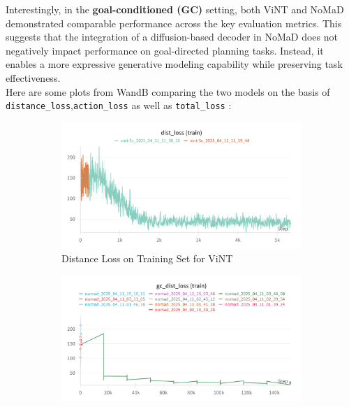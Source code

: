\documentclass[12pt]{article}
\begin{document}
Interestingly, in the \textbf{goal-conditioned (GC)} setting, both ViNT and NoMaD demonstrated comparable performance across the key evaluation metrics. This suggests that the integration of a diffusion-based decoder in NoMaD does not negatively impact performance on goal-directed planning tasks. Instead, it enables a more expressive generative modeling capability while preserving task effectiveness.\\

Here are some plots from WandB comparing the two models on the basis of \texttt{distance\_loss},\texttt{action\_loss} as well as \texttt{total\_loss} :\\
\bigskip
\begin{figure}[H]
    \centering
    \begin{subfigure}[b]{0.48\textwidth}
        \centering
        \includegraphics[width=\textwidth]{images/vint_dist_loss.png}
        \caption{Distance Loss on Training Set for ViNT}
        \label{fig:vint_action_loss_train}
    \end{subfigure}
    \hfill
    \begin{subfigure}[b]{0.48\textwidth}
        \centering
        \includegraphics[width=\textwidth]{images/gc_distloss_nomad.png}

\end{subfigure}
\end{figure}
\end{document}
